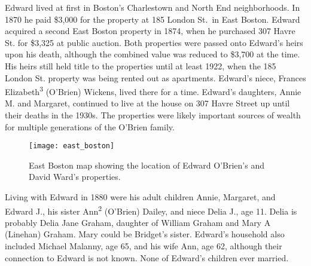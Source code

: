 Edward lived at first in Boston's Charlestown\cite{MaryAnn3OBrienBirth:1} and North End\cite{Edward3OBrienBirth:1} neighborhoods. In 1870 he paid \$3,000 for the property at 185 London St.\ in East Boston.\cite{LondonStDeed:2,LondonStMap} Edward acquired a second East Boston property in 1874, when he purchased 307 Havre St. for \$3,325 at public auction.\cite{HavrePurchase,HavreMap} Both properties were passed onto Edward's heirs upon his death, although the combined value was reduced to \$3,700 at the time.\cite{Edward2OBrienProbate} His heirs still held title to the properties until at least 1922,\cite{Bromley1922} when the 185 London St. property was being rented out as apartments.\cite{GlobeRobbery} Edward's niece, Frances Elizabeth\textsuperscript{3} (O'Brien) Wickens, lived there for a time.\cite{Frances3OBrien1914} Edward's daughters, Annie M. and Margaret, continued to live at the house on 307 Havre Street up until their deaths in the 1930s.\cite{AnnMaria3OBrienDeath:1,Margaret3OBrien2Death:1} The properties were likely important sources of wealth for multiple generations of the O'Brien family.

\begin{figure}
	\centering
	\texttt{[image: east\_boston]}
	\caption{East Boston map showing the location of Edward O'Brien's and David Ward's properties.}
	\label{fig:EastBostonMap}
\end{figure}

Living with Edward in 1880 were his adult children Annie, Margaret, and Edward J., his sister Ann\textsuperscript{2} (O'Brien) Dailey, and niece Delia J., age 11.\cite{Census1880Edward:2} Delia is probably Delia Jane Graham, daughter of William Graham and Mary A (Linehan) Graham.\cite{DeliaGrahamBirth,MaryGrahamDeath:2} Mary could be Bridget's sister. Edward's household also included Michael Malanny, age 65, and his wife Ann, age 62, although their connection to Edward is not known.\cite{Census1880Edward:3} None of Edward's children ever married. 

